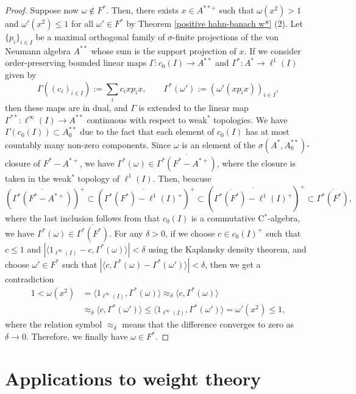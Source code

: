 \documentclass[a4paper]{amsart}
\theoremstyle{plain}
\theoremstyle{definition}
\begin{document}
\begin{proof}
Suppose now $\omega\notin F^*$.
Then, there exists $x\in A^{**+}$ such that $\omega(x^2)>1$ and $\omega'(x^2)\le1$ for all $\omega'\in F^*$ by Theorem \ref{positive hahn-banach w*} (2).
Let $\{p_i\}_{i\in I}$ be a maximal orthogonal family of $\sigma$-finite projections of the von Neumann algebra $A^{**}$ whose sum is the support projection of $x$.
If we consider order-preserving bounded linear maps $\Gamma:c_0(I)\to A^{**}$ and $\Gamma^*:A^*\to\ell^1(I)$ given by
\[\Gamma((c_i)_{i\in I}):=\sum_ic_ixp_ix,\qquad
\Gamma^*(\omega'):=(\omega'(xp_ix))_{i\in I},\]
then these maps are in dual, and $\Gamma$ is extended to the linear map $\Gamma^{**}:\ell^\infty(I)\to A^{**}$ continuous with respect to weak$^*$ topologies.
We have $\Gamma(c_0(I))\subset A_0^{**}$ due to the fact that each element of $c_0(I)$ has at most countably many non-zero components.
Since $\omega$ is an element of the $\sigma(A^*,A_0^{**})$-closure of $F^*-A^{*+}$, we have $\Gamma^*(\omega)\in \overline{\Gamma^*(F^*-A^{*+})}$, where the closure is taken in the weak$^*$ topology of $\ell^1(I)$.
Then, beacuse
\[\left(\overline{\Gamma^*(F^*-A^{*+})}\right)^+\subset\left(\overline{\Gamma^*(F^*)-\ell^1(I)^+}\right)^+\subset\left(\overline{\overline{\Gamma^*(F^*)}-\ell^1(I)^+}\right)^+\subset\overline{\Gamma^*(F^*)},\]
where the last inclusion follows from that $c_0(I)$ is a commutative C$^*$-algebra, we have $\Gamma^*(\omega)\in\overline{\Gamma^*(F^*)}$.
For any $\delta>0$, if we choose $c\in c_0(I)^+$ such that $c\le1$ and $|\langle1_{\ell^\infty(I)}-c,\Gamma^*(\omega)\rangle|<\delta$ using the Kaplansky density theorem, and choose $\omega'\in F^*$ such that $|\langle c,\Gamma^*(\omega)-\Gamma^*(\omega')\rangle|<\delta$, then we get a contradiction
\begin{align*}
1<\omega(x^2)&=\langle1_{\ell^\infty(I)},\Gamma^*(\omega)\rangle\approx_\delta\langle c,\Gamma^*(\omega)\rangle\\
&\approx_\delta\langle c,\Gamma^*(\omega')\rangle\le\langle1_{\ell^\infty(I)},\Gamma^*(\omega')\rangle=\omega'(x^2)\le1,
\end{align*}
where the relation symbol $\approx_\delta$ means that the difference converges to zero as $\delta\to0$.
Therefore, we finally have $\omega\in F^*$.
\end{proof}




\section{Applications to weight theory}
\end{document}
